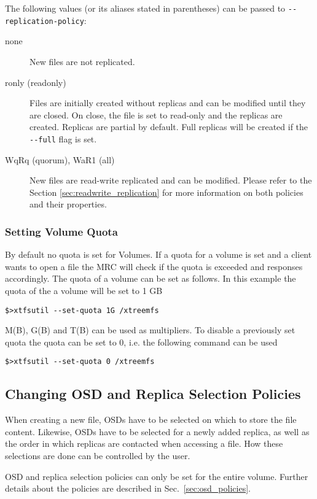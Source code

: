 \documentclass[a4paper,10pt]{book}
\begin{document}
The following values (or its aliases stated in parentheses) can be passed to \verb|--replication-policy|:
\begin{description}
  \item[none] New files are not replicated.
  \item[ronly (readonly)] Files are initially created without replicas and can be modified until they are closed. On close, the file is set to read-only and the replicas are created. Replicas are partial by default. Full replicas will be created if the \verb|--full| flag is set.
  \item[WqRq (quorum), WaR1 (all)] New files are read-write replicated and can be modified. Please refer to the Section \ref{sec:readwrite_replication} for more information on both policies and their properties.
\end{description}

\subsubsection{Setting Volume Quota}
By default no quota is set for Volumes. If a quota for a volume is set and a client wants to open a file the MRC will check if the quota is exceeded and responses accordingly. The quota of a volume can be set as follows. In this example the quota of the a volume will be set to 1 GB
\begin{verbatim}
$>xtfsutil --set-quota 1G /xtreemfs
\end{verbatim}
M(B), G(B) and T(B) can be used as multipliers. To disable a previously set quota the quota can be set to 0, i.e. the following command can be used
\begin{verbatim}
$>xtfsutil --set-quota 0 /xtreemfs
\end{verbatim}

\subsection{Changing OSD and Replica Selection Policies}\label{sec:osd_select_policy}

When creating a new file, OSDs have to be selected on which to store the file content. Likewise, OSDs have to be selected for a newly added replica, as well as the order in which replicas are contacted when accessing a file. How these selections are done can be controlled by the user.

OSD and replica selection policies can only be set for the entire volume. Further details about the policies are described in Sec.\ \ref{sec:osd_policies}.
\end{document}
